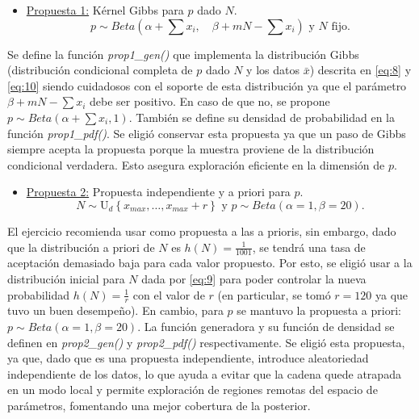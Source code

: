 \begin{itemize}
	\item \underline{Propuesta 1:} 	Kérnel Gibbs para $p$ dado $N$.
	\begin{equation} \label{eq:10}
		p\sim Beta \left(\alpha + \sum x_i, \quad \beta + mN - \sum x_i  \right) \text{ y } N \text{ fijo.}
	\end{equation}
\end{itemize}
Se define la función \textit{prop1\_gen()} que implementa la distribución Gibbs (distribución condicional completa de $p$ dado $N$ y los datos $\bar{x}$) descrita en \eqref{eq:8} y \eqref{eq:10} siendo cuidadosos con el soporte de esta distribución ya que el parámetro $\beta + mN - \sum x_i$ debe ser positivo. En caso de que no, se propone $p\sim Beta (\alpha + \sum x_i, 1)$. También se define su densidad de probabilidad en la función \textit{prop1\_pdf()}. Se eligió conservar esta propuesta ya que un paso de Gibbs siempre acepta la propuesta porque la muestra proviene de la distribución condicional verdadera. Esto asegura exploración eficiente en la dimensión de $p$.

\begin{itemize}
	\item \underline{Propuesta 2:} Propuesta independiente y a priori para $p$.
	\begin{equation} \label{eq:11}
		N \sim \mathrm{U}_{d}\left\{x_{max}, \dots, x_{max} + r\right\} \text{ y } p\sim Beta(\alpha=1, \beta = 20).
	\end{equation}
\end{itemize}
El ejercicio recomienda usar como propuesta a las a prioris, sin embargo, dado que la distribución a priori de $N$ es $h(N)=\frac{1}{1001}$, se tendrá una tasa de aceptación demasiado baja para cada valor propuesto. Por esto, se eligió usar a la distribución inicial para $N$ dada por \eqref{eq:9} para poder controlar la nueva probabilidad $h(N)=\frac{1}{r}$ con el valor de $r$ (en particular, se tomó $r = 120$ ya que tuvo un buen desempeño). En cambio, para $p$ se mantuvo la propuesta a priori: $p\sim Beta(\alpha=1, \beta = 20)$. La función generadora y su función de densidad se definen en \textit{prop2\_gen()} y \textit{prop2\_pdf()} respectivamente. Se eligió esta propuesta, ya que, dado que es una propuesta independiente, introduce aleatoriedad independiente de los datos, lo que ayuda a evitar que la cadena quede atrapada en un modo local y permite exploración de regiones remotas del espacio de parámetros, fomentando una mejor cobertura de la posterior.

